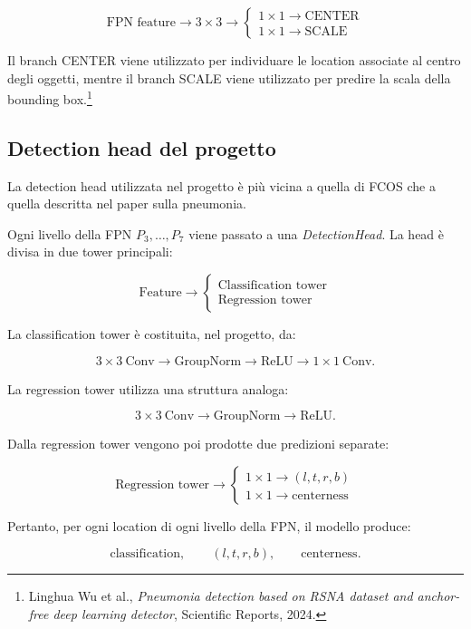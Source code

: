 $$
\text{FPN feature}
\rightarrow
3\times3
\rightarrow
\begin{cases}
1\times1 \rightarrow \text{CENTER}\\
1\times1 \rightarrow \text{SCALE}
\end{cases}
$$

Il branch CENTER viene utilizzato per individuare le location associate al
centro degli oggetti, mentre il branch SCALE viene utilizzato per predire la
scala della bounding box.\footnote{Linghua Wu et al.,
\textit{Pneumonia detection based on RSNA dataset and anchor-free deep learning
detector}, Scientific Reports, 2024.}

\subsection{Detection head del progetto}

La detection head utilizzata nel progetto è più vicina a quella di FCOS che a
quella descritta nel paper sulla pneumonia.

Ogni livello della FPN $P_3,\ldots,P_7$ viene passato a una
\textit{DetectionHead}. La head è divisa in due tower principali:

$$
\text{Feature}
\rightarrow
\begin{cases}
\text{Classification tower}\\
\text{Regression tower}
\end{cases}
$$

La classification tower è costituita, nel progetto, da:

$$
3\times3\ \text{Conv}
\rightarrow
\text{GroupNorm}
\rightarrow
\text{ReLU}
\rightarrow
1\times1\ \text{Conv}.
$$

La regression tower utilizza una struttura analoga:

$$
3\times3\ \text{Conv}
\rightarrow
\text{GroupNorm}
\rightarrow
\text{ReLU}.
$$

Dalla regression tower vengono poi prodotte due predizioni separate:

$$
\text{Regression tower}
\rightarrow
\begin{cases}
1\times1 \rightarrow (l,t,r,b)\\
1\times1 \rightarrow \text{centerness}
\end{cases}
$$

Pertanto, per ogni location di ogni livello della FPN, il modello produce:

$$
\text{classification},\qquad
(l,t,r,b),\qquad
\text{centerness}.
$$


